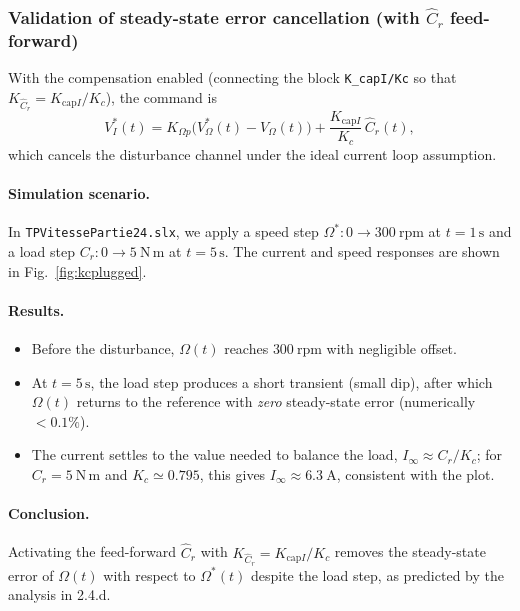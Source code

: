 \documentclass{rapportCS}
\begin{document}
\subsubsection{Validation of steady-state error cancellation (with $\hat C_r$ feed-forward)}

With the compensation enabled (connecting the block \texttt{K\_capI/Kc} so that $K_{\hat C_r}=K_{\text{cap}I}/K_c$), the command is
\[
V_I^\ast(t)=K_{\Omega p}\bigl(V_\Omega^\ast(t)-V_\Omega(t)\bigr)+\frac{K_{\text{cap}I}}{K_c}\,\hat C_r(t),
\]
which cancels the disturbance channel under the ideal current loop assumption. \,

\paragraph{Simulation scenario.}
In \texttt{TPVitessePartie24.slx}, we apply a speed step $\Omega^\ast:0\!\to\!300~\mathrm{rpm}$ at $t=1\,\mathrm{s}$ and a load step $C_r:0\!\to\!5~\mathrm{N\,m}$ at $t=5\,\mathrm{s}$. The current and speed responses are shown in Fig.~\ref{fig:kcplugged}.

\paragraph{Results.}
\begin{itemize}
  \item Before the disturbance, $\Omega(t)$ reaches $300~\mathrm{rpm}$ with negligible offset.
  \item At $t=5\,\mathrm{s}$, the load step produces a short transient (small dip), after which $\Omega(t)$ returns to the reference with \emph{zero} steady-state error (numerically $<0.1\%$).
  \item The current settles to the value needed to balance the load, $I_\infty \approx C_r/K_c$; for $C_r=5~\mathrm{N\,m}$ and $K_c\simeq0.795$, this gives $I_\infty\!\approx\!6.3~\mathrm{A}$, consistent with the plot.
\end{itemize}

\paragraph{Conclusion.}
Activating the feed-forward $\hat C_r$ with $K_{\hat C_r}=K_{\text{cap}I}/K_c$ removes the steady-state error of $\Omega(t)$ with respect to $\Omega^\ast(t)$ despite the load step, as predicted by the analysis in 2.4.d. \,
\end{document}
